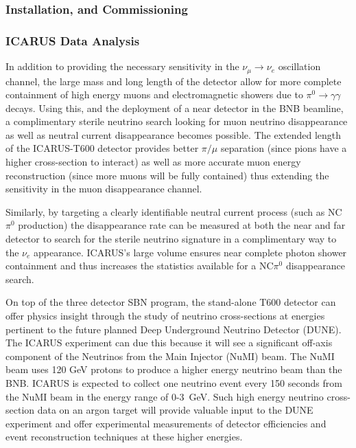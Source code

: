 \subsubsection{Installation, and Commissioning}\label{sec:ICARUSBulid}


\subsubsection{ICARUS Data Analysis}\label{sec:ICARUSDataAnalysis}
In addition to providing the necessary sensitivity in the $\nu_{\mu} \rightarrow \nu_{e}$ oscillation channel, the large mass and long length of the detector allow for more complete containment of high energy muons and electromagnetic showers due to $\pi^{0} \rightarrow \gamma \gamma$ decays. Using this, and the deployment of a near detector in the BNB beamline, a complimentary sterile neutrino search looking for muon neutrino disappearance as well as neutral current disappearance becomes possible. The extended length of the ICARUS-T600 detector provides better $\pi / \mu$ separation (since pions have a higher cross-section to interact) as well as more accurate muon energy reconstruction (since more muons will be fully contained) thus extending the sensitivity in the muon disappearance channel. 

Similarly, by targeting a clearly identifiable neutral current process (such as NC$\pi^{0}$ production) the disappearance rate can be measured at both the near and far detector to search for the sterile neutrino signature in a complimentary way to the $\nu_{e}$ appearance. ICARUS's large volume ensures near complete photon shower containment and thus increases the statistics available for a NC$\pi^{0}$ disappearance search.

On top of the three detector SBN program, the stand-alone T600 detector can offer physics insight through the study of neutrino cross-sections at energies pertinent to the future planned Deep Underground Neutrino Detector (DUNE). The ICARUS experiment can due this because it will see a significant off-axis component of the Neutrinos from the Main Injector (NuMI) beam. The NuMI beam uses 120 GeV protons to produce a higher energy neutrino beam than the BNB. ICARUS is expected to collect one neutrino event every 150 seconds from the NuMI beam in the energy range of 0-3~GeV. Such high energy neutrino cross-section data on an argon target will provide valuable input to the DUNE experiment and offer experimental measurements of detector efficiencies and event reconstruction techniques at these higher energies.

